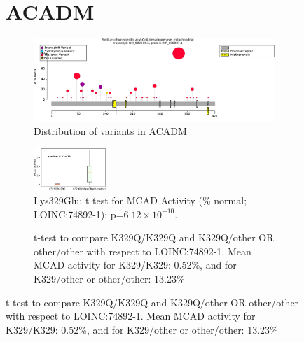 \begin{figure}[htbp]
\section*{ACADM}
\centering
\begin{subfigure}[b]{0.95\textwidth}
\centering
\includegraphics[width=\textwidth]{ img/ACADM_protein_diagram.pdf} 
\captionsetup{justification=raggedright,singlelinecheck=false}
\caption{Distribution of variants in ACADM}
\end{subfigure}

\vspace{2em}

\begin{subfigure}[b]{0.95\textwidth}
\centering
\includegraphics[width=0.3\textwidth]{ img/acadm_k329q.pdf} 
\captionsetup{justification=raggedright,singlelinecheck=false}
\caption{Lys329Glu: t test for MCAD Activity (\% normal; LOINC:74892-1): p=$6.12\times 10^{-10}$.}
\end{subfigure}

\vspace{2em}

\begin{subfigure}[b]{0.95\textwidth}
\captionsetup{justification=raggedright,singlelinecheck=false}
\caption{t-test to compare K329Q/K329Q and K329Q/other OR other/other with respect to LOINC:74892-1. Mean MCAD activity for K329/K329: 0.52\%, and for K329/other or other/other: 13.23\% }
\end{subfigure}


\end{figure}
